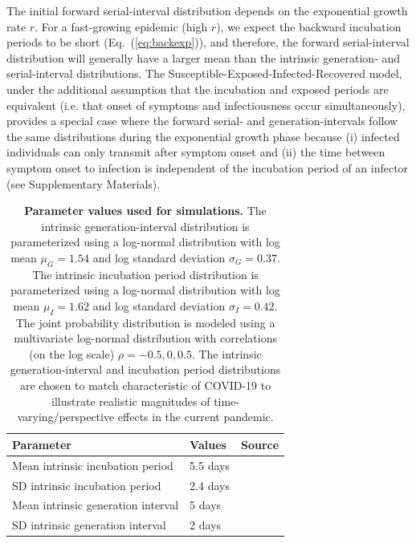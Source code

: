 \documentclass[12pt]{article}
\newcommand{\eref}[1]{Eq.~(\ref{eq:#1})}
\begin{document}
The initial forward serial-interval distribution depends on the exponential growth rate $r$.
For a fast-growing epidemic (high $r$), we expect the backward incubation periods to be short (\eref{backexp}), and therefore, the forward serial-interval distribution will generally have a larger mean than the intrinsic generation- and serial-interval distributions.
The Susceptible-Exposed-Infected-Recovered model, under the additional assumption that the incubation and exposed periods are equivalent (i.e. that onset of symptoms and infectiousness occur simultaneously), provides a special case where the forward serial- and generation-intervals follow the same distributions during the exponential growth phase because (i) infected individuals can only transmit after symptom onset and (ii) the time between symptom onset to infection is independent of the incubation period of an infector (see Supplementary Materials).

\begin{table}[!th]
\begin{center}
\begin{tabular}{|l|l|r|}
\hline
Parameter & Values & Source\\
\hline
Mean intrinsic incubation period & 5.5 days & \cite{lauer2020incubation} \\
SD intrinsic incubation period & 2.4 days & \cite{lauer2020incubation} \\
Mean intrinsic generation interval & 5 days & \cite{ferretti2020quantifying} \\
SD intrinsic generation interval & 2 days & \cite{ferretti2020quantifying} \\
\hline
\end{tabular}
\end{center}
\caption{
  \textbf{Parameter values used for simulations.}
The intrinsic generation-interval distribution is parameterized using a log-normal distribution with log mean $\mu_G=1.54$ and log standard deviation $\sigma_G=0.37$.
The intrinsic incubation period distribution is parameterized using a log-normal distribution with log mean $\mu_I=1.62$ and log standard deviation $\sigma_I=0.42$.
The joint probability distribution is modeled using a multivariate log-normal distribution with correlations (on the log scale) $\rho=-0.5, 0, 0.5$.
The intrinsic generation-interval and incubation period distributions are chosen to match characteristic of COVID-19 to illustrate realistic magnitudes of time-varying/perspective effects in the current pandemic.
}
\end{table}
\end{document}
